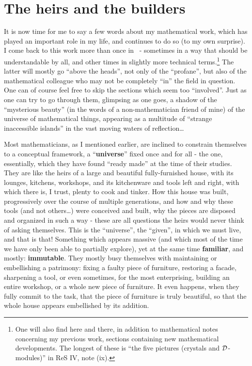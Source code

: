 \section{The heirs and the builders}

It is now time for 
me to say a few words about my mathematical work, which has 
played an important role in my life, and continues to do so (to my own surprise).
I come back to this work more than once in 
\rec\ - sometimes in a way 
that should be
understandable by all, 
and other times in slightly more technical terms.\footnote{One will also find here and
there, in addition to mathematical notes concerning my
previous work, sections containing new mathematical developments. The longest of these is
``the five pictures (crystals and $\mathcal{D}$-modules)'' in ReS IV, note  (ix).
} The latter 
will mostly go ``above the heads'', not only of the ``profane'', but also of the
mathematical colleague who may not be completely ``in'' the field in question.
One can of course feel free to skip the sections which seem too ``involved''. Just as one can
try to go through them, glimpsing as one goes, a shadow of the ``mysterious beauty'' (in
the words of a non-mathematician friend of mine) of the universe of mathematical things,
appearing as a multitude of ``strange inaccessible islands'' in the vast 
moving waters of reflection\ldots

Most mathematicians, as I mentioned earlier, are inclined to constrain themselves to a
conceptual framework, a ``\textbf{universe}'' fixed once and for all - the one,
essentially, which they have found ``ready made'' at the time of their studies.
They are like the heirs of a large and beautiful fully-furnished house, with its lounges,
kitchens, workshops, and its kitchenware and tools left and right, with which there is, I
trust, plenty to cook and tinker.
How this house was built, progressively over the course of multiple generations, 
and how and why these tools (and not others\ldots) were conceived and built, 
why the pieces are disposed and organized in such a way - these are all questions the
heirs would never think of asking themselves.
This is the ``universe'', the ``given'', in which we must live, and that is that!
Something which appears massive (and which most of the time we have only been able to
partially explore), yet at the same time \textbf{familiar}, and mostly:
\textbf{immutable}.
They mostly busy themselves with maintaining or embellishing a patrimony: fixing a faulty
piece of furniture, restoring a facade, sharpening a tool, or even sometimes, for the most
enterprising, building an entire workshop, or a whole new piece of furniture. It even
happens,
when they fully commit to the task, that the piece of furniture is truly
beautiful, so that the whole house appears embellished by its addition. 

